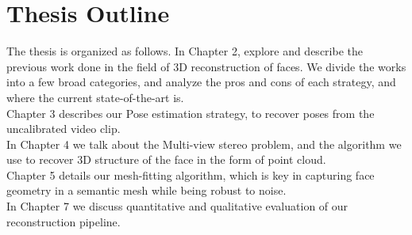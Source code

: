 \section{Thesis Outline}

The thesis is organized as follows. In Chapter 2, explore and describe the previous work done in the field of 3D reconstruction of faces. We divide the works into a few broad categories, and analyze the pros and cons of each strategy, and where the current state-of-the-art is.\\ 
Chapter 3 describes our Pose estimation strategy, to recover poses from the uncalibrated video clip. \\
In Chapter 4 we talk about the Multi-view stereo problem, and the algorithm we use to recover 3D structure of the face in the form of point cloud. \\
Chapter 5 details our mesh-fitting algorithm, which is key in capturing face geometry in a semantic mesh while being robust to noise.\\
In Chapter 7 we discuss quantitative and qualitative evaluation of our reconstruction pipeline.